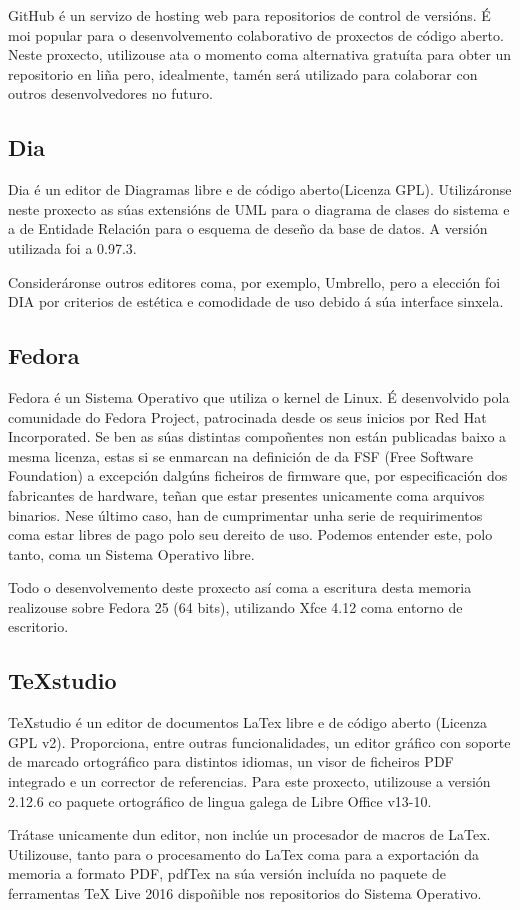 GitHub é un servizo de hosting web para repositorios de control de versións. É moi popular para o desenvolvemento colaborativo de proxectos de código aberto. Neste proxecto, utilizouse ata o momento coma alternativa gratuíta para obter un repositorio en liña pero, idealmente, tamén será utilizado para colaborar con outros desenvolvedores no futuro. 


\subsection{Dia}

Dia é un editor de Diagramas libre e de código aberto(Licenza GPL). Utilizáronse neste proxecto as súas extensións de UML para o diagrama de clases do sistema e a de Entidade Relación para o esquema de deseño da base de datos. A versión utilizada foi a 0.97.3.

Consideráronse outros editores coma, por exemplo, Umbrello, pero a elección foi DIA por criterios de estética e comodidade de uso debido á súa interface sinxela.

\subsection{Fedora}

Fedora é un Sistema Operativo que utiliza o kernel de Linux. É desenvolvido pola comunidade do Fedora Project, patrocinada desde os seus inicios por Red Hat Incorporated. Se ben as súas distintas compoñentes non están publicadas baixo a mesma licenza, estas si se enmarcan na definición de  da FSF (Free Software Foundation) a excepción dalgúns ficheiros de firmware que, por especificación dos fabricantes de hardware, teñan que estar presentes unicamente coma arquivos binarios. Nese último caso, han de cumprimentar unha serie de requirimentos coma estar libres de pago polo seu dereito de uso\cite{fedora}. Podemos entender este, polo tanto, coma un Sistema Operativo libre.

Todo o desenvolvemento deste proxecto así coma a escritura desta memoria realizouse sobre Fedora 25 (64 bits), utilizando Xfce 4.12 coma entorno de escritorio.


\subsection{TeXstudio}

TeXstudio é un editor de documentos LaTex libre e de código aberto (Licenza GPL v2\cite{texstudio}). Proporciona, entre outras funcionalidades, un editor gráfico con soporte de marcado ortográfico para distintos idiomas, un visor de ficheiros PDF integrado e un corrector de referencias. Para este proxecto, utilizouse a versión 2.12.6 co paquete ortográfico de lingua galega de Libre Office v13-10.

Trátase unicamente dun editor, non inclúe un procesador de macros de LaTex. Utilizouse, tanto para o procesamento do LaTex coma para a exportación da memoria a formato PDF, pdfTex na súa versión incluída no paquete de ferramentas TeX Live 2016 dispoñible nos repositorios do Sistema Operativo. 